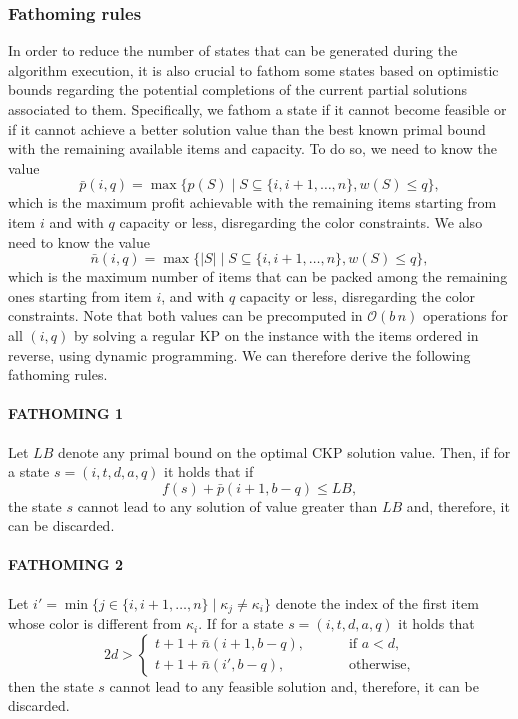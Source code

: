 \documentclass[preprint,11pt]{elsarticle}
\newcommand{\profit}{p}
\newcommand{\weight}{w}
\newcommand{\capacity}{b}
\theoremstyle{definition}
\begin{document}
\subsubsection{Fathoming rules}
In order to reduce the number of states that can be generated during the algorithm execution, it is also crucial to fathom some states based on optimistic bounds regarding the potential completions of the current partial solutions associated to them.
Specifically, we fathom a state if it cannot become feasible or if it cannot achieve a better solution value than the best known primal bound with the remaining available items and capacity.
To do so, we need to know the value
\begin{equation*}
    \bar{\profit}(i,q) =  \max\{\profit(S) \mid S \subseteq \{i,i+1,\dots,n\}, \weight(S) \leq q\},
\end{equation*}
which is the maximum profit achievable with the remaining items starting from item $i$ and with $q$ capacity or less, disregarding the color constraints. We also need to know the value
\begin{equation*}
    \bar{n}(i,q) = \max\{|S| \mid S \subseteq \{i,i+1,\dots,n\}, \weight(S)\leq q\},
\end{equation*}
which is the maximum number of items that can be packed among the remaining ones starting from item $i$, and with $q$ capacity or less, disregarding the color constraints. 
Note that both values can be precomputed in $\mathcal{O}(\capacity \, n)$ operations for all $(i,q)$ by solving a regular KP on the instance with the items ordered in reverse, using dynamic programming. We can therefore derive the following fathoming rules.

\paragraph{FATHOMING 1}
    Let $LB$ denote any primal bound on the optimal CKP solution value.
    Then, if for a state $s = (i,t,d,a,q)$ it holds that if
    \begin{equation*}
    f(s) + \bar{\profit}(i+1,\capacity - q) \leq LB,
    \end{equation*}
    the state $s$ cannot lead to any solution of value greater than $LB$ and, therefore, it can be discarded.

\paragraph{FATHOMING 2}
    Let $i' = \min\{j \in \{i,i+1,\dots,n\} \mid \kappa_j \neq \kappa_i\}$ denote the index of the first item whose color is different from $\kappa_i$.
    If for a state $s = (i,t,d,a,q)$ it holds that
    \begin{equation*}
    2d > \begin{cases}
         t + 1 + \bar{n}(i+1,\capacity - q), \qquad & \text{ if } a < d,\\[1.5ex]
         t + 1 + \bar{n}(i', \capacity - q), & \text{ otherwise,}
    \end{cases}
    \end{equation*}
    then the state $s$ cannot lead to any feasible solution and, therefore, it can be discarded.
\end{document}
